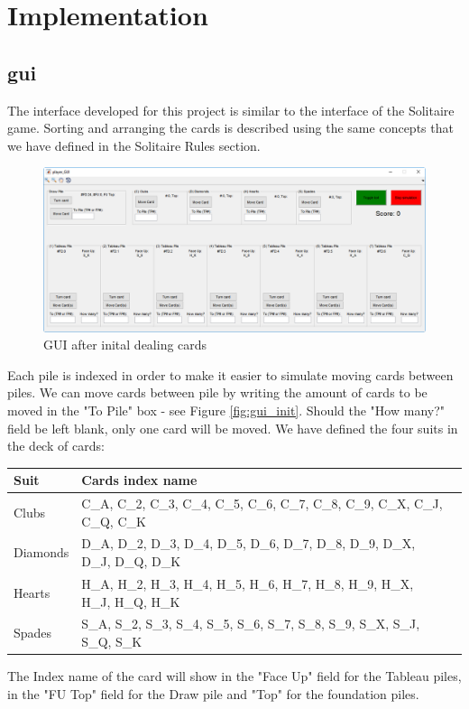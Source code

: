 \documentclass[runningheads,a4paper]{llncs}
\begin{document}
\section{Implementation}
\label{sec:gui_init}
\subsection{\ac{gui}}
The interface developed for this project is similar to the interface of the Solitaire game.
Sorting and arranging the cards is described using the same concepts that we have defined in the Solitaire Rules section.
\begin{figure}
	\begin{center}
		\includegraphics[width=\textwidth]{images/dealinit}
		\caption{GUI after inital dealing cards}
		\label{fig:TP4full}
	\end{center}
\end{figure}
\newline

Each pile is indexed in order to make it easier to simulate moving cards between piles. We can move cards between pile by writing the amount of cards to be moved in the "To Pile" box - see Figure \ref{fig:gui_init}.
\newline
Should the "How many?" field be left blank, only one card will be moved.
We have defined the four suits in the deck of cards:
\begin{center}
	\begin{tabular}{ | l | l | l | }
		\hline
		Suit & Cards index name \\ \hline
		Clubs & C\_A, C\_2, C\_3, C\_4, C\_5, C\_6, C\_7, C\_8, C\_9, C\_X, C\_J, C\_Q, C\_K  \\ \hline
		Diamonds & D\_A, D\_2, D\_3, D\_4, D\_5, D\_6, D\_7, D\_8, D\_9, D\_X, D\_J, D\_Q, D\_K \\ \hline
		Hearts & H\_A, H\_2, H\_3, H\_4, H\_5, H\_6, H\_7, H\_8, H\_9, H\_X, H\_J, H\_Q, H\_K  \\ \hline
		Spades & S\_A,  S\_2, S\_3,  S\_4, S\_5,  S\_6, S\_7,  S\_8, S\_9,  S\_X, S\_J, S\_Q,  S\_K \\ \hline
	\end{tabular}
\end{center}
The Index name of the card will show in the "Face Up" field for the Tableau piles, in the "FU Top" field for the Draw pile and "Top" for the foundation piles.
\end{document}
